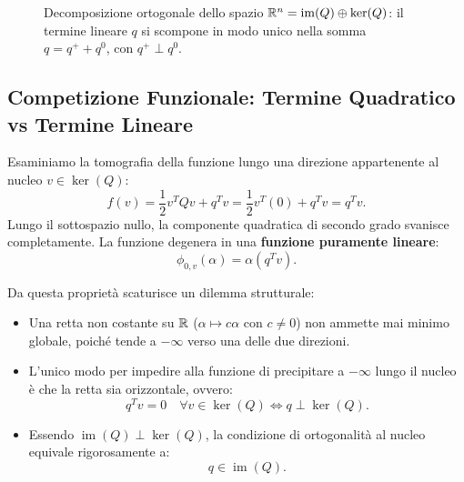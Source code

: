 \begin{figure}[H]
\caption{Decomposizione ortogonale dello spazio $\mathbb{R}^n = \operatorname{im}(Q) \oplus \ker(Q)$: il termine lineare $q$ si scompone in modo unico nella somma $q = q^+ + q^0$, con $q^+ \perp q^0$.}
\label{fig:decomposizione-ortogonale-q}
\end{figure}

\subsection{Competizione Funzionale: Termine Quadratico vs Termine Lineare}
Esaminiamo la tomografia della funzione lungo una direzione appartenente al nucleo $v \in \ker(Q)$:
\begin{equation}
    f(v) = \frac{1}{2} v^T Q v + q^T v = \frac{1}{2} v^T (0) + q^T v = q^T v.
\end{equation}
Lungo il sottospazio nullo, la componente quadratica di secondo grado svanisce completamente. La funzione degenera in una \textbf{funzione puramente lineare}:
\begin{equation}
    \phi_{0, v}(\alpha) = \alpha (q^T v).
\end{equation}

Da questa propriet\`a scaturisce un dilemma strutturale:
\begin{itemize}
    \item Una retta non costante su $\mathbb{R}$ ($\alpha \mapsto c\alpha$ con $c \neq 0$) non ammette mai minimo globale, poich\'e tende a $-\infty$ verso una delle due direzioni.
    \item L'unico modo per impedire alla funzione di precipitare a $-\infty$ lungo il nucleo \`e che la retta sia orizzontale, ovvero:
    \begin{equation}
        q^T v = 0 \quad \forall v \in \ker(Q) \iff q \perp \ker(Q).
    \end{equation}
    \item Essendo $\operatorname{im}(Q) \perp \ker(Q)$, la condizione di ortogonalit\`a al nucleo equivale rigorosamente a:
    \begin{equation}
        q \in \operatorname{im}(Q).
    \end{equation}
\end{itemize}

